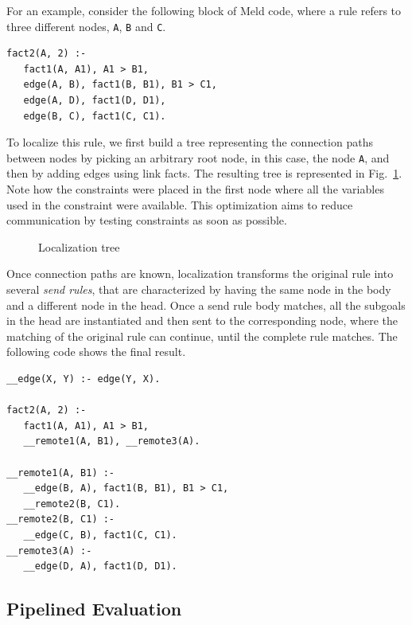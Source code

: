 \documentclass[preprint]{sigplanconf}
\begin{document}
For an example, consider the following block of Meld code, where a rule refers to three different
nodes, \texttt{A}, \texttt{B} and \texttt{C}.

\begin{verbatim}
fact2(A, 2) :-
   fact1(A, A1), A1 > B1,
   edge(A, B), fact1(B, B1), B1 > C1,
   edge(A, D), fact1(D, D1),
   edge(B, C), fact1(C, C1).
\end{verbatim}

To localize this rule, we first build a tree representing the connection paths between nodes by
picking an arbitrary root node, in this case, the node \texttt{A}, and then by adding
edges using link facts. The resulting tree is represented in Fig.~\ref{fig:loctree}.
Note how the constraints were placed in the first node where all the variables used in the constraint
were available. This optimization aims to reduce communication by testing constraints as soon as
possible.

\qtreecenterfalse
\begin{figure}[ht!]
\caption{Localization tree}
\label{fig:loctree}
\end{figure}

Once connection paths are known, localization transforms the original rule into several
\emph{send rules}, that are characterized by having the same node in the body and a different
node in the head. Once a send rule body matches,
all the subgoals in the head are instantiated and then sent to the corresponding node,
where the matching of the original rule can continue, until the complete rule matches.
The following code shows the final result.

\begin{verbatim}
__edge(X, Y) :- edge(Y, X).

fact2(A, 2) :-
   fact1(A, A1), A1 > B1,
   __remote1(A, B1), __remote3(A).
   
__remote1(A, B1) :-
   __edge(B, A), fact1(B, B1), B1 > C1,
   __remote2(B, C1).
__remote2(B, C1) :-
   __edge(C, B), fact1(C, C1).
__remote3(A) :-
   __edge(D, A), fact1(D, D1).
\end{verbatim}

\subsection{Pipelined Evaluation}
\end{document}
